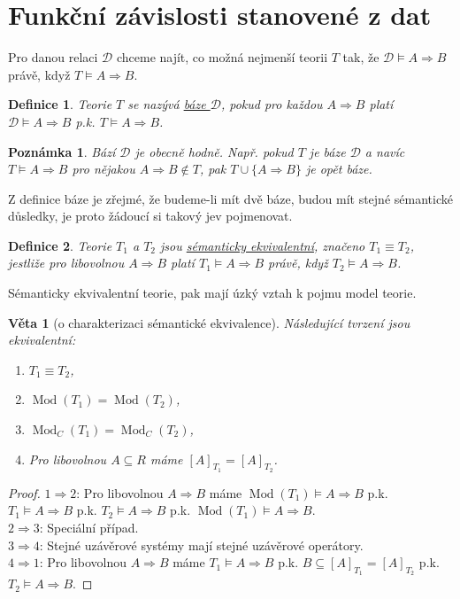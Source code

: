\documentclass{article}
\newtheorem{definition}{Definice}
\newtheorem*{remark}{Poznámka}
\newtheorem{theorem}{Věta}
\DeclareMathOperator{\Mod}{Mod}
\begin{document}
\section {Funkční závislosti stanovené z dat}
Pro danou relaci $\mathcal D$ chceme najít, co možná nejmenší teorii
$T$ tak, že $\mathcal D\models A \Rightarrow B$ právě, když $T\models
A\Rightarrow B$.

\begin {definition}
  Teorie $T$ se nazývá \underline {báze $\mathcal D$}, pokud pro
  každou $A\Rightarrow B$ platí $\mathcal D\models A \Rightarrow B$
  p.k. $T\models A\Rightarrow B$.
\end {definition}

\begin {remark}
  Bází $\mathcal D$ je obecně hodně. Např. pokud $T$ je báze $\mathcal
  D$ a navíc $T\models A\Rightarrow B$ pro nějakou $A\Rightarrow B
  \not\in T$, pak $T\cup \{A\Rightarrow B\}$ je opět báze.
\end {remark}

Z definice báze je zřejmé, že budeme-li mít dvě báze, budou mít stejné
sémantické důsledky, je proto žádoucí si takový jev pojmenovat.

\begin {definition}
  Teorie $T_1$ a $T_2$ jsou \underline {sémanticky ekvivalentní},
  značeno $T_1\equiv T_2$, jestliže pro libovolnou $A \Rightarrow B$
  platí $T_1 \models A\Rightarrow B$ právě, když $T_2 \models
  A\Rightarrow B$.
\end {definition}

Sémanticky ekvivalentní teorie, pak mají úzký vztah k pojmu model
teorie.

\begin {theorem}[o charakterizaci sémantické ekvivalence]
  Následující tvrzení jsou ekvivalentní:
  \begin {enumerate}
  \item $T_1\equiv T_2$,
  \item $\Mod(T_1)=\Mod(T_2)$,
  \item $\Mod_C(T_1)=\Mod_C(T_2)$,
  \item Pro libovolnou $A\subseteq R$ máme $[A]_{T_1}=[A]_{T_2}$.
  \end {enumerate}
\end {theorem}
\begin {proof}
  $1\Rightarrow 2$: Pro libovolnou $A\Rightarrow B$ máme
  $\Mod(T_1)\models A\Rightarrow B$ p.k. $T_1\models A\Rightarrow B$
  p.k. $T_2\models A\Rightarrow B$ p.k. $\Mod(T_1)\models A\Rightarrow
  B$. \\

  $2\Rightarrow 3$: Speciální případ.\\

  $3\Rightarrow 4$: Stejné uzávěrové systémy mají stejné uzávěrové
  operátory.\\

  $4\Rightarrow 1$: Pro libovolnou $A\Rightarrow B$ máme $T_1\models
  A\Rightarrow B$ p.k. $B\subseteq[A]_{T_1}=[A]_{T_2}$
  p.k. $T_2\models A\Rightarrow B$.
\end {proof}
\end{document}
